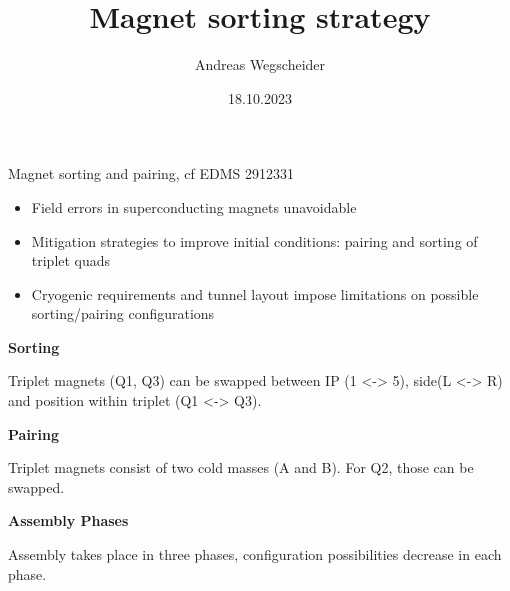 \documentclass[usenames,dvipsnames,aspectratio=169,table]{beamer}
\author[awegsche]{Andreas Wegscheider\\[1em]%
%
}
\title[Magnet sorting]{Magnet sorting strategy}
\institute{CERN}
\date[18.10.23]{18.10.2023}
\begin{document}
\begin{frame}
    \titlepage
\end{frame}


\begin{frame}
    {Magnet sorting and pairing, cf EDMS 2912331}

    \begin{itemize}
        \item Field errors in superconducting magnets unavoidable
        \item Mitigation strategies to improve initial conditions: pairing and sorting of triplet quads
        \item Cryogenic requirements and tunnel layout impose limitations on possible sorting/pairing configurations
    \end{itemize}

    \textbf{Sorting}
    
    Triplet magnets (Q1, Q3) can be swapped between IP (1 <-> 5), side(L <-> R) and position within triplet (Q1 <-> Q3).

    \textbf{Pairing}

    Triplet magnets consist of two cold masses (A and B). For Q2, those can be swapped. 

    \textbf{Assembly Phases}

    Assembly takes place in three phases, configuration possibilities decrease in each phase.

\end{frame}
\end{document}
